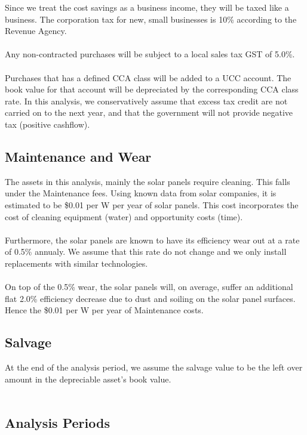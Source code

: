 \documentclass[10pt,letterpaper]{article}
\begin{document}
Since we treat the cost savings as a business income, they will be taxed like a business. The corporation tax for new, small businesses is 10\% according to the Revenue Agency\cite{business-tax}.\\
\\
Any non-contracted purchases will be subject to a local sales tax GST of 5.0\%.\\
\\
Purchases that has a defined CCA class will be added to a UCC account. The book value for that account will be depreciated by the corresponding CCA class rate. In this analysis, we conservatively assume that excess tax credit are not carried on to the next year, and that the government will not provide negative tax (positive cashflow).\\

\subsection{Maintenance and Wear}

The assets in this analysis, mainly the solar panels require cleaning. This falls under the Maintenance fees. Using known data from solar companies, it is estimated to be \$0.01 per W per year of solar panels.\cite{kuby-costs} This cost incorporates the cost of cleaning equipment (water) and opportunity costs (time).\\
\\
Furthermore, the solar panels are known to have its efficiency wear out at a rate of 0.5\% annualy. We assume that this rate do not change and we only install replacements with similar technologies.\\
\\
On top of the 0.5\% wear, the solar panels will, on average, suffer an additional flat 2.0\% efficiency decrease due to dust and soiling on the solar panel surfaces. Hence the \$0.01 per W per year of Maintenance costs.\\

\subsection{Salvage}

At the end of the analysis period, we assume the salvage value to be the left over amount in the depreciable asset's book value.\\
\\

\subsection{Analysis Periods}
\end{document}
